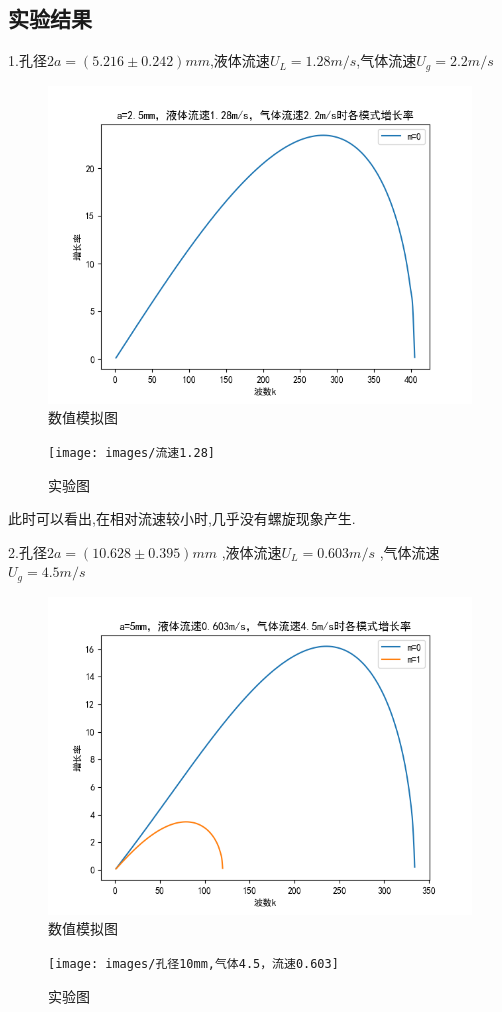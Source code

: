 \documentclass[UTF8]{gapd}
\begin{document}
\subsection{实验结果}
1.孔径$2a=(5.216\pm0.242)mm$,液体流速$U_{L}=1.28m/s$,气体流速$U_{g}=2.2m/s$
\begin{figure}[H]
	\centering
	\includegraphics[width=1\linewidth]{images/22}
	\caption{数值模拟图}
	\label{fig:P2}
\end{figure}
\begin{figure}[H]
	\centering
	\texttt{[image: images/流速1.28]}
	\caption{实验图}
	\label{fig:P2}
\end{figure}

此时可以看出,在相对流速较小时,几乎没有螺旋现象产生.

2.孔径$2a=(10.628 \pm0.395)mm$ ,液体流速$U_{L}=0.603m/s$      ,气体流速$U_{g}=4.5m/s$
\begin{figure}[H]
	\centering
	\includegraphics[width=1\linewidth]{images/45}
	\caption{数值模拟图}
	\label{fig:P2}
\end{figure}
\begin{figure}[H]
	\centering
	\texttt{[image: images/孔径10mm,气体4.5，流速0.603]}
	\caption{实验图}
	\label{fig:P2}
\end{figure}
\end{document}
